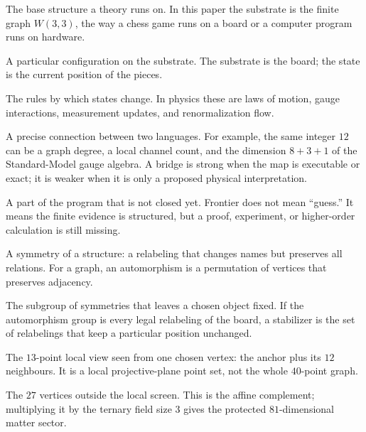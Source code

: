 \documentclass[11pt]{article}
\begin{document}
\begin{statusbox}[title=Vocabulary before the journey]
\begin{description}[leftmargin=2.6em,style=nextline]
\item[Substrate.]
The base structure a theory runs on. In this paper the substrate is the finite graph $W(3,3)$, the way a chess game runs on a board or a computer program runs on hardware.

\item[State.]
A particular configuration on the substrate. The substrate is the board; the state is the current position of the pieces.

\item[Dynamics.]
The rules by which states change. In physics these are laws of motion, gauge interactions, measurement updates, and renormalization flow.

\item[Bridge.]
A precise connection between two languages. For example, the same integer $12$ can be a graph degree, a local channel count, and the dimension $8+3+1$ of the Standard-Model gauge algebra. A bridge is strong when the map is executable or exact; it is weaker when it is only a proposed physical interpretation.

\item[Frontier.]
A part of the program that is not closed yet. Frontier does not mean ``guess.'' It means the finite evidence is structured, but a proof, experiment, or higher-order calculation is still missing.

\item[Automorphism.]
A symmetry of a structure: a relabeling that changes names but preserves all relations. For a graph, an automorphism is a permutation of vertices that preserves adjacency.

\item[Stabilizer.]
The subgroup of symmetries that leaves a chosen object fixed. If the automorphism group is every legal relabeling of the board, a stabilizer is the set of relabelings that keep a particular position unchanged.

\item[Screen.]
The $13$-point local view seen from one chosen vertex: the anchor plus its $12$ neighbours. It is a local projective-plane point set, not the whole $40$-point graph.

\item[Bulk.]
The $27$ vertices outside the local screen. This is the affine complement; multiplying it by the ternary field size $3$ gives the protected $81$-dimensional matter sector.


\end{description}
\end{statusbox}
\end{document}
